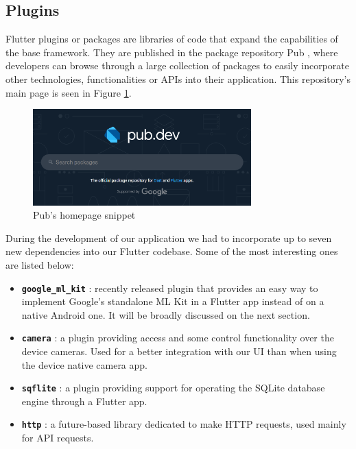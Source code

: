 \subsection{Plugins}

Flutter plugins or packages are libraries of code that expand the capabilities of the base framework. They are published in the package repository Pub \cite{noauthor_dart_nodate}, where developers can browse through a large collection of packages to easily incorporate other technologies, functionalities or APIs into their application. This repository's main page is seen in Figure \ref{fig:pub}.

\begin{figure}[h]
  \centering
  \includegraphics[width=0.75\textwidth]{Figures/pub.png}
  \caption{%
    Pub's homepage snippet
  }
  \label{fig:pub}
\end{figure}

During the development of our application we had to incorporate up to seven new dependencies into our Flutter codebase. Some of the most interesting ones are listed below:

\begin{itemize}
\item \textbf{\texttt{google\_ml\_kit}} \cite{noauthor_google_ml_kit_nodate}: recently released plugin that provides an easy way to implement Google's standalone ML Kit in a Flutter app instead of on a native Android one. It will be broadly discussed on the next section.
\item \textbf{\texttt{camera}} \cite{noauthor_camera_nodate}: a plugin providing access and some control functionality over the device cameras. Used for a better integration with our UI than when using the device native camera app.
\item \textbf{\texttt{sqflite}} \cite{noauthor_sqflite_nodate}: a plugin providing support for operating the SQLite database engine through a Flutter app.
\item \textbf{\texttt{http}} \cite{noauthor_http_nodate}: a future-based library dedicated to make HTTP requests, used mainly for API requests.
\end{itemize}


